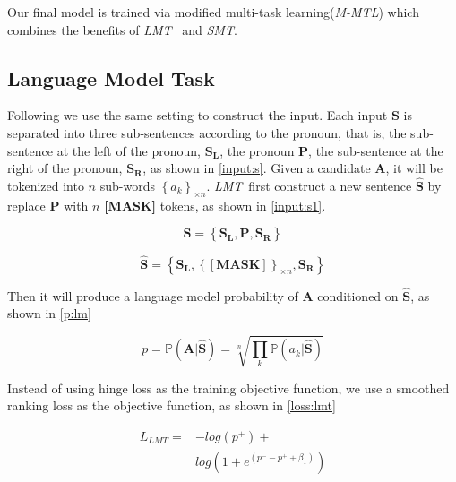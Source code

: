 \documentclass[11pt,a4paper]{article}
\newcommand{\lmt}{\textit{LMT}}
\newcommand{\smt}{\textit{SMT}}
\newcommand{\mmt}{\textit{M-MTL}}
\begin{document}
Our final model is trained via modified multi-task learning(\mmt) which combines the benefits of \lmt~ and \smt. 

\subsection{Language Model Task}
\label{sec:lmt}
Following \cite{kocijan2019surprisingly} we use the same setting to construct the input. Each input $\mathbf{S}$ is separated into three sub-sentences according to the pronoun, that is, the sub-sentence at the left of the pronoun, $\mathbf{S_L}$, the pronoun $\mathbf{P}$, the sub-sentence at the right of the pronoun, $\mathbf{S_R}$, as shown in \eqref{input:s}. 
Given a candidate $\mathbf{A}$, it will be tokenized into $n$ sub-words $\left\{a_k\right\}_{\times n}$. \lmt~first construct a new sentence $\mathbf{\hat{S}}$ by replace $\mathbf{P}$ with $n$ \textbf{[MASK]} tokens, as shown in \eqref{input:s1}. 

\begin{equation}
    \label{input:s}
    \mathbf{S} = \left\{\mathbf{S_L}, \mathbf{P}, \mathbf{S_R}   \right\} 
\end{equation}

\begin{equation}
    \label{input:s1}
    \mathbf{\hat{S}} = \left\{\mathbf{S_L}, \left\{\mathbf{[MASK]}\right\}_{\times n}, \mathbf{S_R} \right\}   
\end{equation}

Then it will produce a language model probability of $\mathbf{A}$ conditioned on $\mathbf{\hat{S}}$, as shown in \eqref{p:lm}

\begin{equation} 
    \label{p:lm}
    p = \mathbb{P}\left(\mathbf{A} \vert \mathbf{\hat{S}}\right) 
    =\sqrt[n]{\prod_k \mathbb{P}\left(a_{k}  \vert \mathbf{\hat{S}}\right)}
\end{equation}

Instead of using hinge loss as the training objective function, we use a smoothed ranking loss as the objective function, as shown in \eqref{loss:lmt}

\begin{equation}
    \label{loss:lmt}
    \begin{split}
    L_{LMT} = &-log\left(p^+\right) + \\
    &log\left(1+e^{\left(p^- - p^+ + \beta_1\right)} \right)
    \end{split}
\end{equation}
\end{document}
